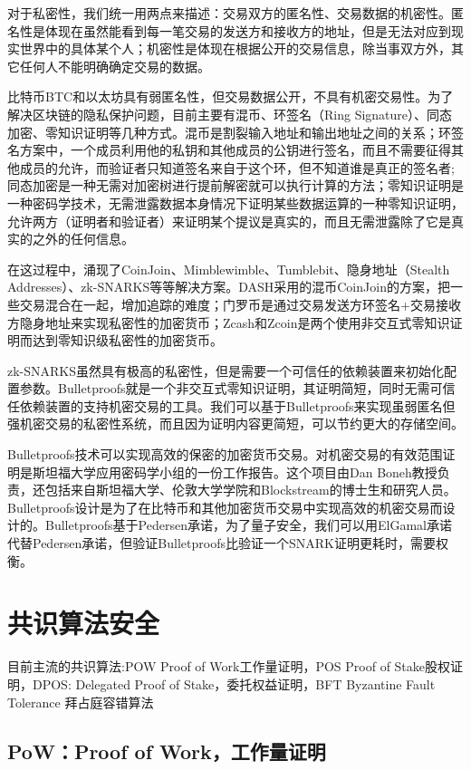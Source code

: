 \documentclass[UTF8]{ctexart}
\begin{document}
对于私密性，我们统一用两点来描述：交易双方的匿名性、交易数据的机密性。匿名性是体现在虽然能看到每一笔交易的发送方和接收方的地址，但是无法对应到现实世界中的具体某个人；机密性是体现在根据公开的交易信息，除当事双方外，其它任何人不能明确确定交易的数据。

比特币BTC和以太坊具有弱匿名性，但交易数据公开，不具有机密交易性。为了解决区块链的隐私保护问题，目前主要有混币、环签名（Ring Signature）、同态加密、零知识证明等几种方式。混币是割裂输入地址和输出地址之间的关系；环签名方案中，一个成员利用他的私钥和其他成员的公钥进行签名，而且不需要征得其他成员的允许，而验证者只知道签名来自于这个环，但不知道谁是真正的签名者;同态加密是一种无需对加密树进行提前解密就可以执行计算的方法；零知识证明是一种密码学技术，无需泄露数据本身情况下证明某些数据运算的一种零知识证明，允许两方（证明者和验证者）来证明某个提议是真实的，而且无需泄露除了它是真实的之外的任何信息。

在这过程中，涌现了CoinJoin、Mimblewimble、Tumblebit、隐身地址（Stealth Addresses）、zk-SNARKS等等解决方案。DASH采用的混币CoinJoin的方案，把一些交易混合在一起，增加追踪的难度；门罗币是通过交易发送方环签名+交易接收方隐身地址来实现私密性的加密货币；Zcash和Zcoin是两个使用非交互式零知识证明而达到零知识级私密性的加密货币。

zk-SNARKS虽然具有极高的私密性，但是需要一个可信任的依赖装置来初始化配置参数。Bulletproofs就是一个非交互式零知识证明，其证明简短，同时无需可信任依赖装置的支持机密交易的工具。我们可以基于Bulletproofs来实现虽弱匿名但强机密交易的私密性系统，而且因为证明内容更简短，可以节约更大的存储空间。

Bulletproofs技术可以实现高效的保密的加密货币交易。对机密交易的有效范围证明是斯坦福大学应用密码学小组的一份工作报告。这个项目由Dan Boneh教授负责，还包括来自斯坦福大学、伦敦大学学院和Blockstream的博士生和研究人员。Bulletproofs设计是为了在比特币和其他加密货币交易中实现高效的机密交易而设计的。Bulletproofs基于Pedersen承诺，为了量子安全，我们可以用ElGamal承诺代替Pedersen承诺，但验证Bulletproofs比验证一个SNARK证明更耗时，需要权衡。

\section{共识算法安全}

目前主流的共识算法:POW Proof of Work工作量证明，POS Proof of Stake股权证明，DPOS: Delegated Proof of Stake，委托权益证明，BFT Byzantine Fault Tolerance 拜占庭容错算法


\subsection{PoW：Proof of Work，工作量证明}
\end{document}
